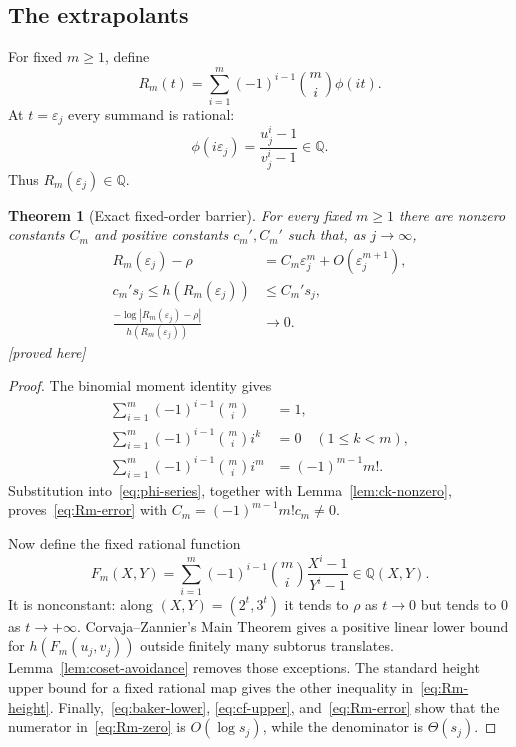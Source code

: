 \documentclass[11pt,oneside]{article}
\newtheorem{theorem}{Theorem}[section]
\theoremstyle{definition}
\theoremstyle{remark}
\newcommand{\Q}{\mathbb Q}
\newcommand{\eps}{\varepsilon}
\newcommand{\proved}{\textcolor{deepgreen}{\textsf{[proved here]}}}
\begin{document}
\subsection{The extrapolants}

For fixed $m\ge1$, define
\begin{equation}
 R_m(t)=\sum_{i=1}^m(-1)^{i-1}\binom mi\phi(it).
 \label{eq:Rm}
\end{equation}
At $t=\eps_j$ every summand is rational:
\begin{equation}
 \phi(i\eps_j)=\frac{u_j^i-1}{v_j^i-1}\in\Q.
 \label{eq:phi-rational}
\end{equation}
Thus $R_m(\eps_j)\in\Q$.

\begin{theorem}[Exact fixed-order barrier]
\label{thm:richardson}
For every fixed $m\ge1$ there are nonzero constants $C_m$ and positive constants
$c_m',C_m'$ such that, as $j\to\infty$,
\begin{align}
 R_m(\eps_j)-\rho
 &=C_m\eps_j^m+O(\eps_j^{m+1}),
 \label{eq:Rm-error}\\
 c_m's_j\le h(R_m(\eps_j))&\le C_m's_j,
 \label{eq:Rm-height}\\
 \frac{-\log|R_m(\eps_j)-\rho|}{h(R_m(\eps_j))}&\longrightarrow0.
 \label{eq:Rm-zero}
\end{align}
\proved
\end{theorem}

\begin{proof}
The binomial moment identity gives
\begin{align*}
 \sum_{i=1}^m(-1)^{i-1}\binom mi&=1,\\
 \sum_{i=1}^m(-1)^{i-1}\binom mi i^k&=0
 \quad(1\le k<m),\\
 \sum_{i=1}^m(-1)^{i-1}\binom mi i^m&=(-1)^{m-1}m!.
\end{align*}
Substitution into~\eqref{eq:phi-series}, together with
Lemma~\ref{lem:ck-nonzero}, proves~\eqref{eq:Rm-error} with
$C_m=(-1)^{m-1}m!c_m\ne0$.

Now define the fixed rational function
\begin{equation}
 F_m(X,Y)=\sum_{i=1}^m(-1)^{i-1}\binom mi\frac{X^i-1}{Y^i-1}
 \in\Q(X,Y).
 \label{eq:Fm}
\end{equation}
It is nonconstant: along $(X,Y)=(2^t,3^t)$ it tends to $\rho$ as $t\to0$ but tends to $0$
as $t\to+\infty$.  Corvaja--Zannier's Main Theorem gives a positive linear lower bound for
$h(F_m(u_j,v_j))$ outside finitely many subtorus translates.  Lemma~\ref{lem:coset-avoidance}
removes those exceptions.  The standard height upper bound for a fixed rational map gives
the other inequality in~\eqref{eq:Rm-height}.  Finally,~\eqref{eq:baker-lower},
\eqref{eq:cf-upper}, and~\eqref{eq:Rm-error} show that the numerator in~\eqref{eq:Rm-zero} is
$O(\log s_j)$, while the denominator is $\Theta(s_j)$.
\end{proof}
\end{document}
